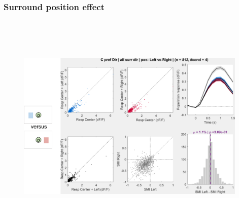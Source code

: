 \subsubsection{Surround position effect}

\begin{figure}[H] \centering \includegraphics[width=11cm,height=11cm,keepaspectratio]{Figures/7.Results/population/sel/diagrams/2.png} 
\end{figure}


%

